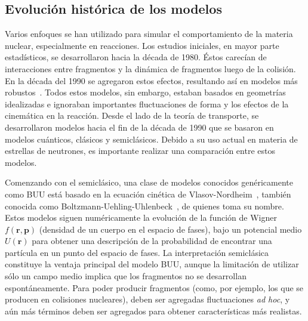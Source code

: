 \subsection{Evolución histórica de los modelos}
Varios enfoques se han utilizado para simular el comportamiento de la materia nuclear, especialmente en reacciones.
Los estudios iniciales, en mayor parte estadísticos, se desarrollaron hacia la década de 1980.
Éstos carecían de interacciones entre fragmentos y la dinámica de fragmentos luego de la colisión.
En la década del 1990 se agregaron estos efectos, resultando así en modelos más robustos~\cite{barz_cluster_1996}.
Todos estos modelos, sin embargo, estaban basados en geometrías idealizadas e ignoraban importantes fluctuaciones de forma y los efectos de la cinemática en la reacción.
Desde el lado de la teoría de transporte, se desarrollaron modelos hacia el fin de la década de 1990 que se basaron en modelos cuánticos, clásicos y semiclásicos.
Debido a su uso actual en materia de estrellas de neutrones, es importante realizar una comparación entre estos modelos.

Comenzando con el semiclásico, una clase de modelos conocidos genéricamente como BUU está basado en la ecuación cinética de Vlasov-Nordheim~\cite{nordheim_kinetic_1928}, también conocida como Boltzmann-Uehling-Uhlenbeck~\cite{uehling_transport_1933}, de quienes toma su nombre.
Estos modelos siguen numéricamente la evolución de la función de Wigner $f(\mathbf{r},\mathbf{p})$ (densidad de un cuerpo en el espacio de fases), bajo un potencial medio $U(\mathbf{r})$ para obtener una descripción de la probabilidad de encontrar una partícula en un punto del espacio de fases.
La interpretación semiclásica constituye la ventaja principal del modelo BUU, aunque la limitación de utilizar sólo un campo medio implica que los fragmentos no se desarrollan espontáneamente.
Para poder producir fragmentos (como, por ejemplo, los que se producen en colisiones nucleares), deben ser agregadas fluctuaciones \emph{ad hoc}, y aún más términos deben ser agregados para obtener características más realistas.

